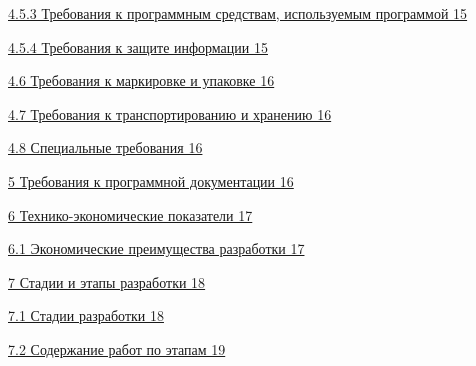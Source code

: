 \hyperref[ux442ux440ux435ux431ux43eux432ux430ux43dux438ux44f-ux43a-ux43fux440ux43eux433ux440ux430ux43cux43cux43dux44bux43c-ux441ux440ux435ux434ux441ux442ux432ux430ux43c-ux438ux441ux43fux43eux43bux44cux437ux443ux435ux43cux44bux43c-ux43fux440ux43eux433ux440ux430ux43cux43cux43eux439]{4.5.3
Требования к программным средствам, используемым программой 15}

\hyperref[ux442ux440ux435ux431ux43eux432ux430ux43dux438ux44f-ux43a-ux437ux430ux449ux438ux442ux435-ux438ux43dux444ux43eux440ux43cux430ux446ux438ux438]{4.5.4
Требования к защите информации 15}

\hyperref[ux442ux440ux435ux431ux43eux432ux430ux43dux438ux44f-ux43a-ux43cux430ux440ux43aux438ux440ux43eux432ux43aux435-ux438-ux443ux43fux430ux43aux43eux432ux43aux435]{4.6
Требования к маркировке и упаковке 16}

\hyperref[ux442ux440ux435ux431ux43eux432ux430ux43dux438ux44f-ux43a-ux442ux440ux430ux43dux441ux43fux43eux440ux442ux438ux440ux43eux432ux430ux43dux438ux44e-ux438-ux445ux440ux430ux43dux435ux43dux438ux44e]{4.7
Требования к транспортированию и хранению 16}

\hyperref[ux441ux43fux435ux446ux438ux430ux43bux44cux43dux44bux435-ux442ux440ux435ux431ux43eux432ux430ux43dux438ux44f]{4.8
Специальные требования 16}

\hyperref[ux442ux440ux435ux431ux43eux432ux430ux43dux438ux44f-ux43a-ux43fux440ux43eux433ux440ux430ux43cux43cux43dux43eux439-ux434ux43eux43aux443ux43cux435ux43dux442ux430ux446ux438ux438]{5
Требования к программной документации 16}

\hyperref[ux442ux435ux445ux43dux438ux43aux43e-ux44dux43aux43eux43dux43eux43cux438ux447ux435ux441ux43aux438ux435-ux43fux43eux43aux430ux437ux430ux442ux435ux43bux438]{6
Технико-экономические показатели 17}

\hyperref[ux44dux43aux43eux43dux43eux43cux438ux447ux435ux441ux43aux438ux435-ux43fux440ux435ux438ux43cux443ux449ux435ux441ux442ux432ux430-ux440ux430ux437ux440ux430ux431ux43eux442ux43aux438]{6.1
Экономические преимущества разработки 17}

\hyperref[ux441ux442ux430ux434ux438ux438-ux438-ux44dux442ux430ux43fux44b-ux440ux430ux437ux440ux430ux431ux43eux442ux43aux438]{7
Стадии и этапы разработки 18}

\hyperref[ux441ux442ux430ux434ux438ux438-ux440ux430ux437ux440ux430ux431ux43eux442ux43aux438]{7.1
Стадии разработки 18}

\hyperref[ux441ux43eux434ux435ux440ux436ux430ux43dux438ux435-ux440ux430ux431ux43eux442-ux43fux43e-ux44dux442ux430ux43fux430ux43c]{7.2
Содержание работ по этапам 19}

